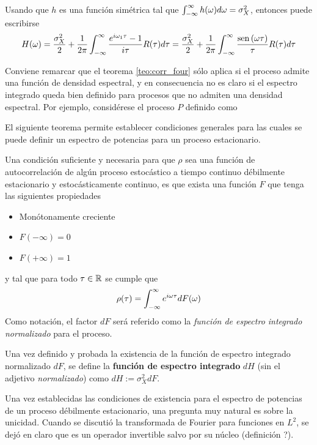 Usando que $h$ es una función simétrica tal que $\int_{-\infty}^{\infty} h(\omega) d\omega = \sigma_X^{2}$, entonces puede escribirse
\begin{equation}
H(\omega) = \frac{\sigma_X^{2}}{2} + \frac{1}{2 \pi} \int_{-\infty}^{\infty} \frac{e^{i \omega_1 \tau}-1}{i \tau} R(\tau) d\tau = \frac{\sigma_X^{2}}{2} + \frac{1}{2 \pi} \int_{-\infty}^{\infty} \frac{\mathrm{sen}\left( \omega \tau \right)}{\tau} R(\tau) d\tau
\end{equation}

Conviene remarcar que el teorema \ref{teo:corr_four} sólo aplica si el proceso admite una función de densidad espectral, y en consecuencia no es claro si el espectro integrado queda bien definido para procesos que no admiten una densidad espectral. 
%
Por ejemplo, considérese el proceso $P$ definido como 

El siguiente teorema permite establecer condiciones generales para las cuales se puede definir un espectro de potencias para un proceso estacionario.

\begin{teorema}
Una condición suficiente y necesaria para que $\rho$ sea una función de autocorrelación de algún proceso estocástico a tiempo continuo \xt débilmente estacionario y estocásticamente continuo, es que exista una función $F$ que tenga las siguientes propiedades
\begin{itemize}
\item Monótonamente creciente
\item $F(-\infty) = 0$
\item $F(+\infty) = 1$
\end{itemize}
y tal que para todo $\tau \in \mathbb{R}$ se cumple que
\begin{equation*}
\rho(\tau) = \int_{-\infty}^{\infty} e^{i \omega \tau} dF(\omega)
\end{equation*}
Como notación, el factor $dF$ será referido como la \textit{función de espectro integrado normalizado} para el proceso.
\label{t_wienerkhinchin}
\end{teorema}

Una vez definido y probada la existencia de la función de espectro integrado normalizado $dF$, se define la \textbf{función de espectro integrado} $dH$ (sin el adjetivo \textit{normalizado}) como
$dH := \sigma_X^{2} dF$.


Una vez establecidas las condiciones de existencia para el espectro de potencias de un proceso débilmente estacionario, una pregunta muy natural es sobre la unicidad.
%
Cuando se discutió la transformada de Fourier para funciones en $L^{2}$, se dejó en claro que es un operador invertible salvo por su núcleo (definición ?).

